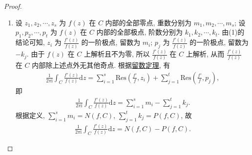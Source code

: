 \documentclass[../../main.tex]{subfiles}%
\begin{document}
\begin{proof}
\begin{enumerate}[(1)]
\item 设 \(z_1, z_2, \cdots, z_s\) 为 \(f(z)\) 在 \(C\) 内部的全部零点, 重数分别为 \(m_1, m_2, \cdots, m_s\); 设 \(p_1, p_2, \cdots, p_t\) 为 \(f(z)\) 在 \(C\) 内部的全部极点, 阶数分别为 \(k_1, k_2, \cdots, k_t\).
由(1)的结论可知, \(z_i\) 为 \(\frac{f'(z)}{f(z)}\) 的一阶极点, 留数为 \(m_i\); \(p_j\) 为 \(\frac{f'(z)}{f(z)}\) 的一阶极点, 留数为 \(-k_j\).
由于 \(f(z)\) 在 \(C\) 上解析且不为零, 所以 \(\frac{f'(z)}{f(z)}\) 在 \(C\) 上解析, 从而 \(\frac{f'(z)}{f(z)}\) 在 \(C\) 内部除上述点外无其他奇点. 根据\hyperref[theorem:留数定理(残数定理)-定理5.4.9]{留数定理}, 有
\begin{align*}
\frac{1}{2\pi \mathrm{i}} \int_C \frac{f'(z)}{f(z)} \mathrm{d}z = \sum\limits_{i=1}^{s} \mathrm{Res}\left(\frac{f'}{f}, z_i\right) + \sum\limits_{j=1}^{t} \mathrm{Res}\left(\frac{f'}{f}, p_j\right),
\end{align*}
即
\begin{align*}
\frac{1}{2\pi \mathrm{i}} \int_C \frac{f'(z)}{f(z)} \mathrm{d}z = \sum\limits_{i=1}^{s} m_i - \sum\limits_{j=1}^{t} k_j.
\end{align*}
根据定义, \(\sum\limits_{i=1}^{s} m_i = N(f, C)\), \(\sum\limits_{j=1}^{t} k_j = P(f, C)\), 故
\begin{align*}
\frac{1}{2\pi \mathrm{i}} \int_C \frac{f'(z)}{f(z)} \mathrm{d}z = N(f, C) - P(f, C).
\end{align*}
\end{enumerate}
\end{proof}
\end{document}
